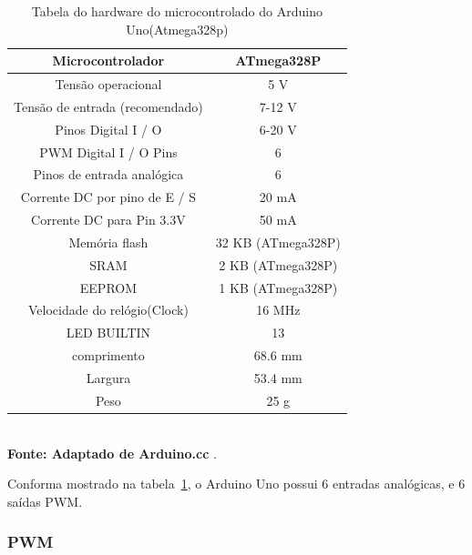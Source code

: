 \FloatBarrier
\begin{table}[!htbp]
	\centering
	\caption{Tabela do hardware do microcontrolado do Arduino Uno(Atmega328p)}
	\begin{tabular}{ c | c }
		\hline
		Microcontrolador                & ATmega328P         \\ \hline
		Tensão operacional              & 5 V                \\ \hline
		Tensão de entrada (recomendado) & 7-12 V             \\ \hline
		Pinos Digital I / O             & 6-20 V             \\ \hline
		PWM Digital I / O Pins          & 6                  \\ \hline
		Pinos de entrada analógica      & 6                  \\ \hline
		Corrente DC por pino de E / S   & 20 mA              \\ \hline
		Corrente DC para Pin 3.3V       & 50 mA              \\ \hline
		Memória flash                   & 32 KB (ATmega328P) \\ \hline
		SRAM                            & 2 KB (ATmega328P)  \\ \hline
		EEPROM                          & 1 KB (ATmega328P)  \\ \hline
		Velocidade do relógio(Clock)    & 16 MHz             \\ \hline
		LED BUILTIN                     & 13                 \\ \hline
		comprimento                     & 68.6 mm            \\ \hline
		Largura                         & 53.4 mm            \\ \hline
		Peso                            & 25 g               \\ \hline
	\end{tabular}
	\\ \vspace{0.2cm}
	\textbf{Fonte: Adaptado de Arduino.cc} .
	\label{tab:ArduinoUno}
\end{table}
\FloatBarrier

Conforma mostrado na tabela~\ref{tab:ArduinoUno}, o Arduino Uno possui 6 entradas analógicas, e 6 saídas PWM.

\subsubsection{PWM}

